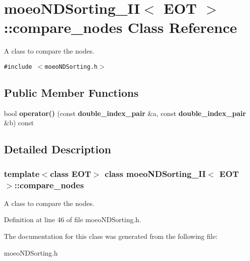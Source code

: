 \section{moeo\-NDSorting\_\-II$<$ EOT $>$::compare\_\-nodes Class Reference}
\label{classmoeoNDSorting__II_1_1compare__nodes}
A class to compare the nodes.  


{\tt \#include $<$moeo\-NDSorting.h$>$}

\subsection*{Public Member Functions}
\begin{CompactItemize}
\item 
bool {\bf operator()} (const {\bf double\_\-index\_\-pair} \&a, const {\bf double\_\-index\_\-pair} \&b) const\label{classmoeoNDSorting__II_1_1compare__nodes_471ebe9e88bfc778c4c281399eb0c196}

\end{CompactItemize}


\subsection{Detailed Description}
\subsubsection*{template$<$class EOT$>$ class moeo\-NDSorting\_\-II$<$ EOT $>$::compare\_\-nodes}

A class to compare the nodes. 



Definition at line 46 of file moeo\-NDSorting.h.

The documentation for this class was generated from the following file:\begin{CompactItemize}
\item 
moeo\-NDSorting.h\end{CompactItemize}
